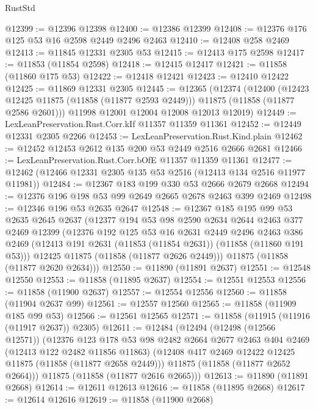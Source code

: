 \begin{lexlean}{RustStd}
\begin{coremodule}
@12399 := @12396 @12398
@12400 := @12386 @12399
@12408 := @12376 @176 @125 @53 @16 @2598 @2449 @2496 @2463
@12410 := @12408 @258 @2469
@12413 := @11845 @12331 @2305 @53
@12415 := @12413 @175 @2598
@12417 := @11853 (@11854 @2598)
@12418 := @12415 @12417
@12421 := @11858 (@11860 @175 @53)
@12422 := @12418 @12421
@12423 := @12410 @12422
@12425 := @11869 @12331 @2305
@12445 := @12365
    (@12374
      (@12400
        (@12423 @12425 @11875 (@11858 (@11877 @2593 @2449)))
        @11875
        (@11858 (@11877 @2586 @2601)))
      @11998
      @12001
      @12004
      @12008
      @12013
      @12019)
@12449 := LexLeanPreservation.Rust.Corr.kIf @11357 @11359 @11361
@12452 := @12449 @12331 @2305 @2266
@12453 := LexLeanPreservation.Rust.Kind.plain
@12462 := @12452 @12453 @2612 @135 @200 @53 @2449 @2516 @2666 @2681
@12466 := LexLeanPreservation.Rust.Corr.bOfE @11357 @11359 @11361
@12477 := @12462 (@12466 @12331 @2305 @135 @53 @2516 (@12413 @134 @2516 @11977 @11981))
@12484 := @12367 @183 @199 @330 @53 @2666 @2679 @2668
@12494 := @12376 @196 @198 @53 @99 @2649 @2665 @2678 @2463 @399 @2469
@12498 := @12346 @196 @53 @2635 @2647
@12548 := @12367
    @185
    @195
    @99
    @53
    @2635
    @2645
    @2637
    (@12377
      @194
      @53
      @98
      @2590
      @2634
      @2644
      @2463
      @377
      @2469
      @12399
      (@12376
        @192
        @125
        @53
        @16
        @2631
        @2449
        @2496
        @2463
        @386
        @2469
        (@12413 @191 @2631 (@11853 (@11854 @2631)) (@11858 (@11860 @191 @53)))
        @12425
        @11875
        (@11858 (@11877 @2626 @2449)))
      @11875
      (@11858 (@11877 @2620 @2634)))
@12550 := @11890 (@11891 @2637)
@12551 := @12548 @12550
@12553 := @11858 (@11895 @2637)
@12554 := @12551 @12553
@12556 := @11858 (@11900 @2637)
@12557 := @12554 @12556
@12560 := @11858 (@11904 @2637 @99)
@12561 := @12557 @12560
@12565 := @11858 (@11909 @185 @99 @53)
@12566 := @12561 @12565
@12571 := @11858 (@11915 (@11916 (@11917 @2637)) @2305)
@12611 := @12484
    (@12494
      (@12498 (@12566 @12571))
      (@12376
        @123
        @178
        @53
        @98
        @2482
        @2664
        @2677
        @2463
        @404
        @2469
        (@12413 @122 @2482 @11856 @11863)
        (@12408 @417 @2469 @12422 @12425 @11875 (@11858 (@11877 @2658 @2449)))
        @11875
        (@11858 (@11877 @2652 @2664)))
      @11875
      (@11858 (@11877 @2616 @2665)))
@12613 := @11890 (@11891 @2668)
@12614 := @12611 @12613
@12616 := @11858 (@11895 @2668)
@12617 := @12614 @12616
@12619 := @11858 (@11900 @2668)

\end{coremodule}
\end{lexlean}
